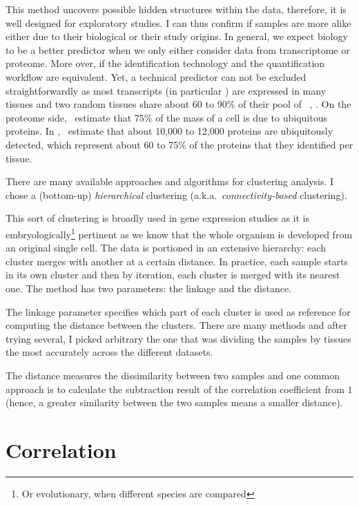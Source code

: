 This method uncovers possible hidden structures within the data, therefore,
it is well designed for exploratory studies.
I can thus confirm if samples are more alike either due to their
biological or their study origins. In general, we expect biology to be a better
predictor when we only either consider data from transcriptome or proteome.
More over, if the identification technology and the quantification workflow are
equivalent. Yet, a technical predictor can not be excluded straightforwardly
as most transcripts (in particular \mRNAs) are expressed in many tissues
and two random tissues share about 60 to 90\% of their pool of
\mRNAs~\citep{ramskoldan:2009}, \citep{UhlenGastro}.
On the proteome side,~\cite{PandeyData}
estimate that 75\% of the mass of a cell is due to ubiquitous proteins.
In ,~\cite{KusterData} estimate that about 10,000
to 12,000 proteins are ubiquitously detected, which represent about 60 to 75\%
of the proteins that they identified per tissue.

There are many available approaches and algorithms for clustering analysis.
I chose a (bottom-up) \emph{hierarchical} clustering
(a.k.a.\ \emph{connectivity-based} clustering).

This sort of clustering is broadly used in gene expression studies as it is
embryologically\footnote{Or evolutionary, when different species are compared}
pertinent as we know that the whole organism is developed from
an original single cell. The data is portioned in an extensive hierarchy:
each cluster merges with another at a certain distance.
In practice, each sample starts in its own cluster and then
by iteration, each cluster is merged with its nearest one. The method has
two parameters: the linkage and the distance. 

The linkage parameter specifies which part of each cluster is used as reference
for computing the distance between the clusters. There are many methods and after
trying several, I picked arbitrary the one that was dividing
the samples by tissues the most accurately across the different datasets.

The distance measures the dissimilarity between two samples and one common
approach is to calculate the subtraction result of
the correlation coefficient from $1$ (hence, a greater similarity between the two
samples means a smaller distance).

\section{Correlation}

